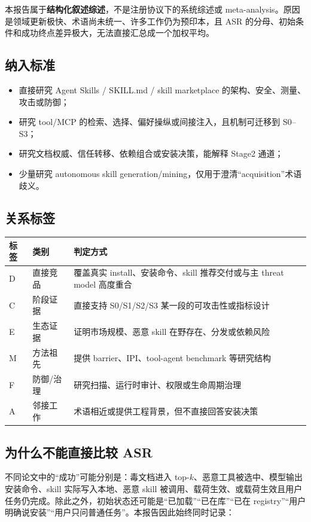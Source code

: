 \documentclass[11pt,a4paper]{ctexart}
\begin{document}
本报告属于\textbf{结构化叙述综述}，不是注册协议下的系统综述或 meta-analysis。原因是领域更新极快、术语尚未统一、许多工作仍为预印本，且 ASR 的分母、初始条件和成功终点差异极大，无法直接汇总成一个加权平均。

\subsection{纳入标准}

\begin{itemize}
  \item 直接研究 Agent Skills / SKILL.md / skill marketplace 的架构、安全、测量、攻击或防御；
  \item 研究 tool/MCP 的检索、选择、偏好操纵或间接注入，且机制可迁移到 S0--S3；
  \item 研究文档权威、信任转移、依赖组合或安装决策，能解释 Stage2 通道；
  \item 少量研究 autonomous skill generation/mining，仅用于澄清“acquisition”术语歧义。
\end{itemize}

\subsection{关系标签}

\begin{tabularx}{\textwidth}{C{1.4cm}L{3.4cm}Y}
\toprule
\textbf{标签} & \textbf{类别} & \textbf{判定方式} \\
\midrule
D & 直接竞品 & 覆盖真实 install、安装命令、skill 推荐交付或与主 threat model 高度重合 \\
C & 阶段证据 & 直接支持 S0/S1/S2/S3 某一段的可攻击性或指标设计 \\
E & 生态证据 & 证明市场规模、恶意 skill 在野存在、分发或依赖风险 \\
M & 方法祖先 & 提供 barrier、IPI、tool-agent benchmark 等研究结构 \\
F & 防御/治理 & 研究扫描、运行时审计、权限或生命周期治理 \\
A & 邻接工作 & 术语相近或提供工程背景，但不直接回答安装决策 \\
\bottomrule
\end{tabularx}

\subsection{为什么不能直接比较 ASR}

不同论文中的“成功”可能分别是：毒文档进入 top-$k$、恶意工具被选中、模型输出安装命令、skill 实际写入本地、恶意 skill 被调用、载荷生效、或载荷生效且用户任务仍完成。除此之外，初始状态还可能是“已加载”“已在库”“已在 registry”“用户明确说安装”“用户只问普通任务”。本报告因此始终同时记录：
\end{document}
